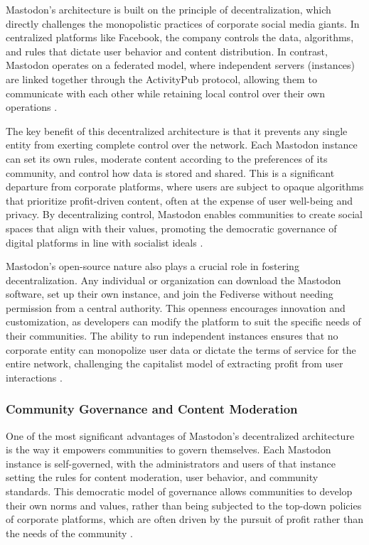\begin{refsection}
Mastodon’s architecture is built on the principle of decentralization, which directly challenges the monopolistic practices of corporate social media giants. In centralized platforms like Facebook, the company controls the data, algorithms, and rules that dictate user behavior and content distribution. In contrast, Mastodon operates on a federated model, where independent servers (instances) are linked together through the ActivityPub protocol, allowing them to communicate with each other while retaining local control over their own operations \cite[pp.~45-67]{klein2020}.

The key benefit of this decentralized architecture is that it prevents any single entity from exerting complete control over the network. Each Mastodon instance can set its own rules, moderate content according to the preferences of its community, and control how data is stored and shared. This is a significant departure from corporate platforms, where users are subject to opaque algorithms that prioritize profit-driven content, often at the expense of user well-being and privacy. By decentralizing control, Mastodon enables communities to create social spaces that align with their values, promoting the democratic governance of digital platforms in line with socialist ideals \cite[pp.~120-134]{scholz2017}.

Mastodon’s open-source nature also plays a crucial role in fostering decentralization. Any individual or organization can download the Mastodon software, set up their own instance, and join the Fediverse without needing permission from a central authority. This openness encourages innovation and customization, as developers can modify the platform to suit the specific needs of their communities. The ability to run independent instances ensures that no corporate entity can monopolize user data or dictate the terms of service for the entire network, challenging the capitalist model of extracting profit from user interactions \cite[pp.~90-105]{robbins2020}.

\subsubsection{Community Governance and Content Moderation}

One of the most significant advantages of Mastodon’s decentralized architecture is the way it empowers communities to govern themselves. Each Mastodon instance is self-governed, with the administrators and users of that instance setting the rules for content moderation, user behavior, and community standards. This democratic model of governance allows communities to develop their own norms and values, rather than being subjected to the top-down policies of corporate platforms, which are often driven by the pursuit of profit rather than the needs of the community \cite[pp.~77-90]{klein2020}.


\end{refsection}
